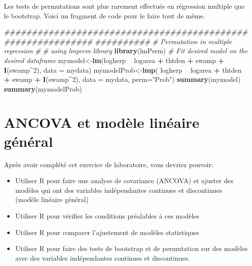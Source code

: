 \documentclass[12pt,]{book}
\newenvironment{Shaded}{\begin{snugshade}}{\end{snugshade}}
\newcommand{\CommentTok}[1]{\textcolor[rgb]{0.56,0.35,0.01}{\textit{#1}}}
\newcommand{\DataTypeTok}[1]{\textcolor[rgb]{0.13,0.29,0.53}{#1}}
\newcommand{\DecValTok}[1]{\textcolor[rgb]{0.00,0.00,0.81}{#1}}
\newcommand{\KeywordTok}[1]{\textcolor[rgb]{0.13,0.29,0.53}{\textbf{#1}}}
\newcommand{\NormalTok}[1]{#1}
\newcommand{\OperatorTok}[1]{\textcolor[rgb]{0.81,0.36,0.00}{\textbf{#1}}}
\newcommand{\StringTok}[1]{\textcolor[rgb]{0.31,0.60,0.02}{#1}}
\providecommand{\tightlist}{%
  \setlength{\itemsep}{0pt}\setlength{\parskip}{0pt}}
\begin{document}
Les tests de permutations sont plus rarement effectués en régression multiple que le bootstrap. Voici un fragment de code pour le faire tout de même.

\begin{Shaded}
\begin{Highlighting}[]
\CommentTok{############################################################}
\CommentTok{##########}
\CommentTok{# Permutation in multiple regression}
\CommentTok{#}
\CommentTok{# using lmperm library}
\KeywordTok{library}\NormalTok{(lmPerm)}
\CommentTok{# Fit desired model on the desired dataframe}
\NormalTok{mymodel<-}\KeywordTok{lm}\NormalTok{(logherp }\OperatorTok{~}\StringTok{ }\NormalTok{logarea }\OperatorTok{+}\StringTok{ }\NormalTok{thtden }\OperatorTok{+}\StringTok{ }\NormalTok{swamp }\OperatorTok{+}\StringTok{ }\KeywordTok{I}\NormalTok{(swamp}\OperatorTok{^}\DecValTok{2}\NormalTok{),}
  \DataTypeTok{data =}\NormalTok{ mydata)}
\NormalTok{mymodelProb<-}\KeywordTok{lmp}\NormalTok{(}
\NormalTok{  logherp }\OperatorTok{~}\StringTok{ }\NormalTok{logarea }\OperatorTok{+}\StringTok{ }\NormalTok{thtden }\OperatorTok{+}\StringTok{ }\NormalTok{swamp }\OperatorTok{+}\StringTok{ }\KeywordTok{I}\NormalTok{(swamp}\OperatorTok{^}\DecValTok{2}\NormalTok{),}
  \DataTypeTok{data =}\NormalTok{ mydata, }\DataTypeTok{perm=}\StringTok{"Prob"}\NormalTok{)}
\KeywordTok{summary}\NormalTok{(mymodel)}
\KeywordTok{summary}\NormalTok{(mymodelProb)}
\end{Highlighting}
\end{Shaded}

\hypertarget{ancova-et-moduxe8le-linuxe9aire-guxe9nuxe9ral}{%
\chapter{ANCOVA et modèle linéaire général}\label{ancova-et-moduxe8le-linuxe9aire-guxe9nuxe9ral}}

Après avoir complété cet exercice de laboratoire, vous devriez pouvoir:

\begin{itemize}
\tightlist
\item
  Utiliser R pour faire une analyse de covariance (ANCOVA) et ajuster des modèles qui ont des variables indépendantes continues et discontinues (modèle linéaire général)
\item
  Utiliser R pour vérifier les conditions préalables à ces modèles
\item
  Utiliser R pour comparer l'ajustement de modèles statistiques
\item
  Utiliser R pour faire des tests de bootstrap et de permutation sur des modèles avec des variables indépendantes continues et discontinues.
\end{itemize}
\end{document}
